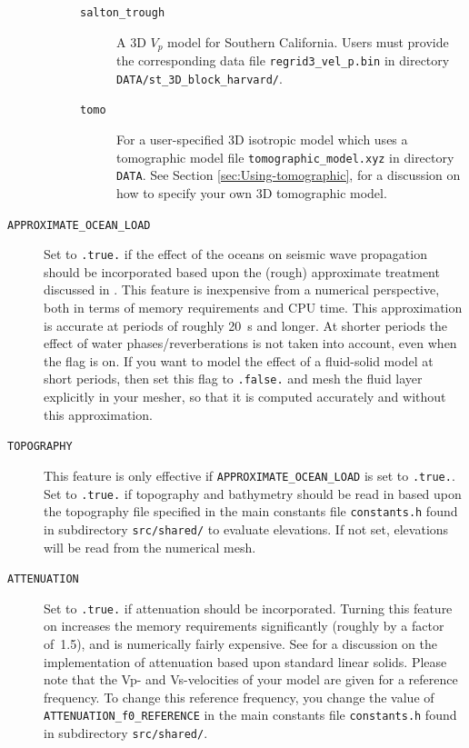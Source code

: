 \begin{description}
\begin{description}
\begin{description}
\item [{\texttt{salton\_trough}}] A 3D $V_{p}$ model for Southern California.
Users must provide the corresponding data file \texttt{regrid3\_vel\_p.bin}
in directory \texttt{DATA/st\_3D\_block\_harvard/}.

\item [{\texttt{tomo}}] For a user-specified 3D isotropic model which uses
a tomographic model file \texttt{tomographic\_model.xyz} in directory
\texttt{DATA}. See Section \ref{sec:Using-tomographic}, for a discussion
on how to specify your own 3D tomographic model.
\end{description}
\end{description}

\item [{\texttt{APPROXIMATE\_OCEAN\_LOAD}}] Set to \texttt{.true.} if the
effect of the oceans on seismic wave propagation should be incorporated
based upon the (rough) approximate treatment discussed in \citet{KoTr02b}.
This feature is inexpensive from a numerical perspective, both in
terms of memory requirements and CPU time. This approximation is accurate
at periods of roughly 20~s and longer. At shorter periods the effect
of water phases/reverberations is not taken into account, even when
the flag is on. If you want to model the effect of a fluid-solid model
at short periods, then set this flag to \texttt{.false.} and mesh
the fluid layer explicitly in your mesher, so that it is computed
accurately and without this approximation.
\item [{\texttt{TOPOGRAPHY}}] This feature is only effective if \texttt{APPROXIMATE\_OCEAN\_LOAD}
is set to \texttt{.true.}. Set to \texttt{.true.} if topography and
bathymetry should be read in based upon the topography file specified
in the main constants file \texttt{constants.h} found in subdirectory
\texttt{src/shared/} to evaluate elevations. If not set, elevations
will be read from the numerical mesh.
\item [{\texttt{ATTENUATION}}] Set to \texttt{.true.} if attenuation should
be incorporated. Turning this feature on increases the memory requirements
significantly (roughly by a factor of~1.5), and is numerically fairly
expensive. See \citet{KoTr99,KoTr02a} for a discussion on the implementation
of attenuation based upon standard linear solids. Please note that
the Vp- and Vs-velocities of your model are given for a reference
frequency. To change this reference frequency, you change the value
of \texttt{ATTENUATION\_f0\_REFERENCE} in the main constants file
\texttt{constants.h} found in subdirectory \texttt{src/shared/}.

\end{description}
